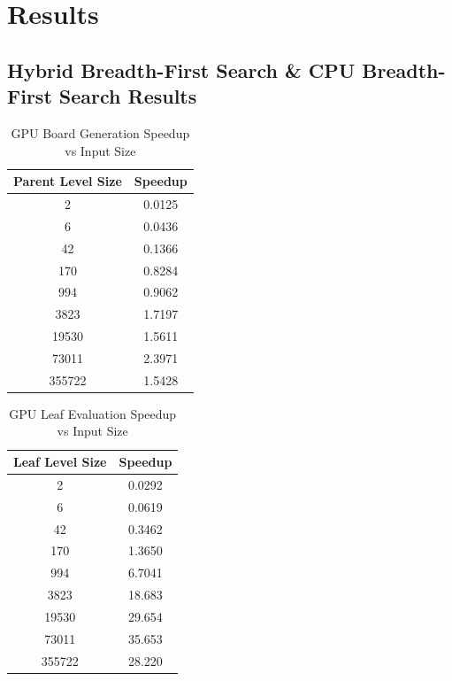 \documentclass[11pt]{article}
\begin{document}
\newpage
\section{Results}
\subsection{Hybrid Breadth-First Search \& CPU Breadth-First Search Results}
\label{sec:bfsresults}


\begin{table}[ht]
  \centering
  \begin{tabular}[ht]{ | c | c | }
    \hline
    Parent Level Size & Speedup \\ 
    \hline
    2      & 0.0125 \\
    6      & 0.0436 \\
    42     & 0.1366 \\
    170    & 0.8284 \\
    994    & 0.9062 \\
    3823   & 1.7197 \\
    19530  & 1.5611 \\
    73011  & 2.3971 \\
    355722 & 1.5428 \\ 
    \hline
  \end{tabular}
  \caption
  { 
    GPU Board Generation Speedup vs Input Size 
    \label{tab:bfsboardgenspeed-up}
  }
\end{table}

\begin{table}[ht]
  \centering
  \begin{tabular}[ht]{ | c | c | }
    \hline
    Leaf Level Size & Speedup \\ 
    \hline
    2      & 0.0292 \\
    6      & 0.0619 \\
    42     & 0.3462 \\
    170    & 1.3650 \\
    994    & 6.7041 \\
    3823   & 18.683 \\
    19530  & 29.654 \\
    73011  & 35.653 \\
    355722 & 28.220 \\ 
    \hline
  \end{tabular}
  \caption
  {
    GPU Leaf Evaluation Speedup vs Input Size
    \label{tab:bfsleafevalspeed-up}
  }
\end{table}
\end{document}
